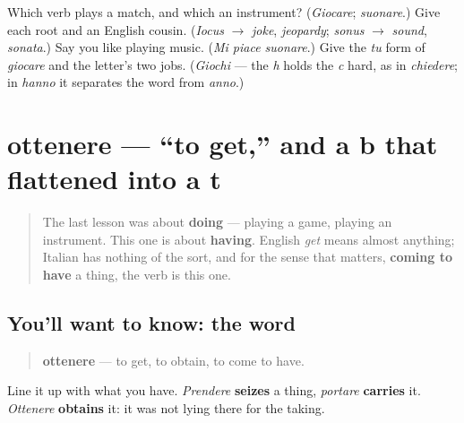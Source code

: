\begin{tcolorbox}[breakable,colback=teal!4,colframe=teal!35!black,title={Before you move on}]
Which verb plays a match, and which an instrument? (\emph{Giocare}; \emph{suonare}.) Give each root and an English cousin. (\emph{Iocus} $\to$ \emph{joke}, \emph{jeopardy}; \emph{sonus} $\to$ \emph{sound}, \emph{sonata}.) Say you like playing music. (\emph{Mi piace suonare}.) Give the \emph{tu} form of \emph{giocare} and the letter's two jobs. (\emph{Giochi} — the \emph{h} holds the \emph{c} hard, as in \emph{chiedere}; in \emph{hanno} it separates the word from \emph{anno}.)
\end{tcolorbox}
\section[ottenere]{ottenere — \textquotedblleft{}to get,\textquotedblright{} and a b that flattened into a t}

\label{lesson:IT-C21-ottenere}



\begin{quote}
The last lesson was about \textbf{doing} — playing a game, playing an instrument. This one is about \textbf{having}. English \emph{get} means almost anything; Italian has nothing of the sort, and for the sense that matters, \textbf{coming to have} a thing, the verb is this one.
\end{quote}

\subsection*{You'll want to know: the word}
\begin{quote}
\textbf{ottenere} — to get, to obtain, to come to have.
\end{quote}

Line it up with what you have. \emph{Prendere} \textbf{seizes} a thing, \emph{portare} \textbf{carries} it. \emph{Ottenere} \textbf{obtains} it: it was not lying there for the taking.

